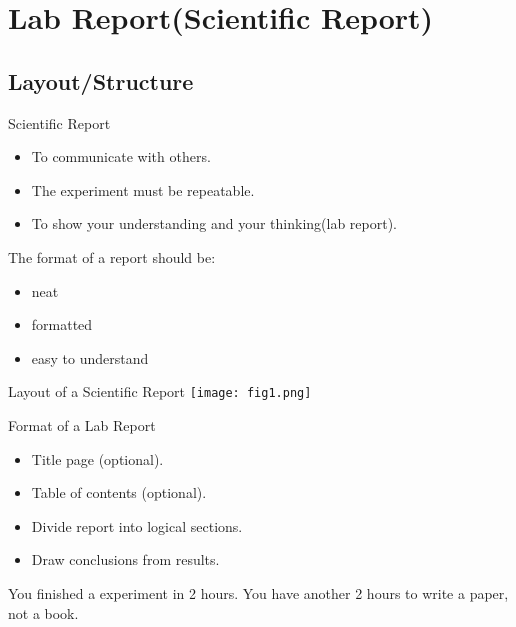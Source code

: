 \documentclass[14pt,t]{beamer}
\begin{document}
\section{Lab Report(Scientific Report)}

\subsection{Layout/Structure}
\begin{frame}{Scientific Report}
\begin{itemize}
    \item To communicate with others.
    \item The experiment must be repeatable.
    \item To show your understanding and your thinking(lab report).
\end{itemize}

The format of a report should be:
\begin{itemize}
    \item neat
    \item formatted
    \item easy to understand
\end{itemize}
\end{frame}

\begin{frame}{Layout of a Scientific Report}
\centering
\texttt{[image: fig1.png]}
\end{frame}

\begin{frame}{Format of a Lab Report}
\begin{itemize}
    \item Title page (optional).
    \item Table of contents (optional).
    \item Divide report into logical sections.
    \item Draw conclusions from results.
\end{itemize}
    You finished a experiment in 2 hours. You have another 2 hours
    to write a paper, not a book.
\end{frame}
\end{document}

